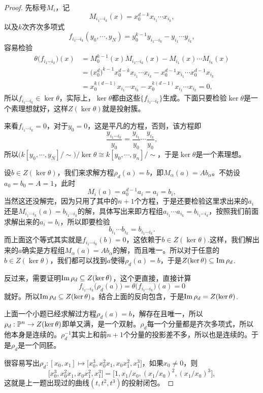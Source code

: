 \documentclass[9pt]{extbook}
\theoremstyle{plain}%
\begin{document}
\begin{proof}
	 先标号$M_i$，记
	\[
		M_{i_1\cdots i_k}(x)=x_0^{d-k}x_{i_1}\cdots x_{i_k},
	\]
	以及$k$次齐次多项式
	\[
		f_{i_1\cdots i_k}(y_0,\cdots,y_N)=y_0^{k-1}y_{i_1\cdots i_k}-y_{i_1}\cdots y_{i_k},
	\]
	容易检验
	\begin{align*}
		\theta\bigl(f_{i_1\cdots i_k}\bigr)(x)&=M_0^{k-1}(x)M_{i_1\cdots i_k}(x)-M_{i_1}(x)\cdots M_{i_k}(x)\\
		&=\bigl(x_0^{d}\bigr)^{k-1}x_0^{d-k}x_{i_1}\cdots x_{i_k}-x_0^{d-1}x_{i_1}\cdots x_0^{d-1}x_{i_k}\\
		&=x_0^{k(d-1)}x_{i_1}\cdots x_{i_k}
		-x_0^{k(d-1)}x_{i_1}\cdots x_{i_k}=0,
	\end{align*}
	所以$f_{i_1\cdots i_k}\in \ker \theta$，实际上，$\ker \theta$都由这些$\bigl\{f_{i_1\cdots i_k}\bigr\}$生成。下面只要检验$\ker \theta$是一个素理想就好，这样$Z(\ker \theta)$就是投射簇。

	来看$f_{i_1\cdots i_k}=0$，对于$y_0=0$，这是平凡的方程，否则，该方程即
	\[
		\frac{y_{i_1\cdots i_k}}{y_0}=\frac{y_{i_1}}{y_0}\cdots \frac{y_{i_k}}{y_0},
	\]
	所以$\bigl(k[y_0,\cdots,y_N]/\sim\bigr)/\ker \theta \cong k[y_0,\cdots,y_n]/\sim$，于是$\ker \theta$是一个素理想。

	 设$b\in Z(\ker\theta)$，我们来求解方程$\rho_d(a)=b$，即$M_\alpha(a)=A b_\alpha$。不妨设$a_0=b_0=A=1$，此时
	\[
		M_i(a)=a_0^{d-1}a_i=a_i=b_i,
	\]
	当然这还没解完，因为只用了其中的$n+1$个方程，于是还要检验这里求出来的$a_i$还是$M_{i_1\cdots i_k}(a)=b_{i_1\cdots i_k}$的解，具体写出来即方程组$a_{i_1}\cdots a_{i_k}=b_{i_1\cdots i_k}$，按照我们前面求解出来的$a_i=b_i$，所以即要检验
	\[
		b_{i_1}\cdots b_{i_k}=b_{i_1\cdots i_k}.
	\]
	而上面这个等式其实就是$f_{i_1\cdots i_k}(b)=0$，这依赖于$b\in Z(\ker\theta)$.这样，我们解出来的$a$确实是方程组$M_\alpha(a)=A b_\alpha$的解，而且唯一。所以对于任意的$b\in Z(\ker\theta)$，我们都可以找到$a$使得$\rho_d(a)=b$，于是$Z(\ker \theta)\subseteq \operatorname{Im} \rho_d$.

	反过来，需要证明$\operatorname{Im} \rho_d\subseteq Z(\ker \theta)$，这个更直接，直接计算
	\[
		f_{i_1\cdots i_k}\bigl(\rho_d(a)\bigr)=\theta\bigl(f_{i_1\cdots i_k}\bigr)(a)=0
	\]
	就好。所以$\operatorname{Im} \rho_d\subseteq Z(\ker \theta)$。结合上面的反向包含，于是$\operatorname{Im} \rho_d=Z(\ker \theta)$.

	 上面一个小题已经求解过方程$\rho_d(a)=b$，解存在且唯一，所以$\rho_d:\mathbb{P}^{n}\to Z(\ker \theta)$即单又满，是一个双射。$\rho_d$每一个分量都是齐次多项式，所以他本身是连续的。$\rho_d^{-1}$其实上和前$n+1$个分量的投影差不多，所以也是连续的。于是$\rho_d$是一个同胚。

	 很容易写出$\rho_d:[x_0,x_1]\mapsto \bigl[x_0^3,x_0^2x_1,x_0x_1^2,x_1^3\bigr]$，如果$x_0\neq 0$，则
	\[
		\bigl[x_0^3,x_0^2x_1,x_0x_1^2,x_1^3\bigr]=\bigl[1,x_1/x_0,(x_1/x_0)^2,(x_1/x_0)^3\bigr],
	\]
	这就是上一题出现过的曲线$(t,t^2,t^3)$的投射闭包。
\end{proof}
\end{document}
